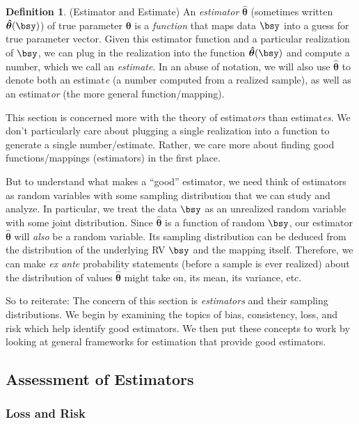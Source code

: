 \documentclass[12pt]{article}
\theoremstyle{plain}
\theoremstyle{definition}
\newtheorem{defn}[thm]{Definition}
\theoremstyle{remark}
\newcommand{\bstheta}{\boldsymbol{\theta}}
\newcommand{\bshattheta}{\boldsymbol{\hat{\theta}}}
\begin{document}
\begin{defn}(Estimator and Estimate)
An \emph{estimator} $\bshattheta$ (sometimes written
$\bshattheta(\bsy)$) of true parameter $\bstheta$ is a \emph{function}
that maps data $\bsy$ into a guess for true parameter vector.
Given this estimator function and a particular realization of $\bsy$,
we can plug in the realization into the function $\bshattheta(\bsy)$ and
compute a number, which we call an \emph{estimate}.
In an abuse of notation, we will also use $\bshattheta$ to denote both
an estimat\emph{e} (a number computed from a realized sample), as well
as an estimat\emph{or} (the more general function/mapping).

This section is concerned more with the theory of estimat\emph{ors} than
estimat\emph{es}. We don't particularly care about plugging a single
realization into a function to generate a single number/estimate.
Rather, we care more about finding good functions/mappings (estimators)
in the first place.

But to understand what makes a ``good'' estimator, we need think of
estimators as random variables with some sampling distribution that we
can study and analyze. In particular, we treat the data $\bsy$ as an
unrealized random variable with some joint distribution. Since
$\bshattheta$ is a function of random $\bsy$, our estimator
$\bshattheta$ will \emph{also} be a random variable. Its sampling
distribution can be deduced from the distribution of the underlying RV
$\bsy$ and the mapping itself. Therefore, we can make \emph{ex ante}
probability statements (before a sample is ever realized) about the
distribution of values $\bshattheta$ might take on, its mean, its
variance, etc.

So to reiterate: The concern of this section is \emph{estimators} and
their sampling distributions. We begin by examining the topics of bias,
consistency, loss, and risk which help identify good estimators. We then
put these concepts to work by looking at general frameworks for
estimation that provide good estimators.
\end{defn}


\clearpage
\subsection{Assessment of Estimators}

\subsubsection{Loss and Risk}
\end{document}

